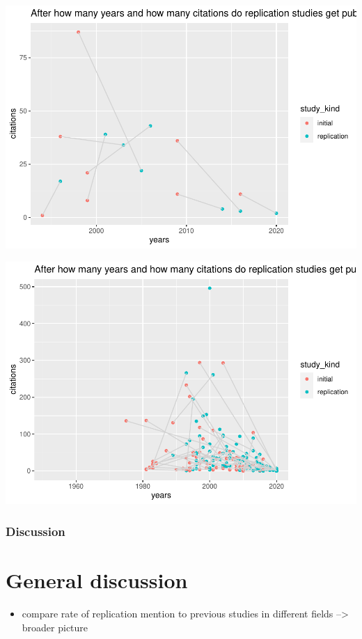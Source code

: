 \documentclass[]{elsarticle} %
\providecommand{\tightlist}{%
  \setlength{\itemsep}{0pt}\setlength{\parskip}{0pt}}
\begin{document}
\includegraphics{ReplicationLing_files/figure-latex/plot cit and years direct-1.pdf}

\includegraphics{ReplicationLing_files/figure-latex/plot cit and years all-1.pdf}

\hypertarget{discussion-1}{%
\subsubsection{Discussion}\label{discussion-1}}

\hypertarget{general-discussion}{%
\section{General discussion}\label{general-discussion}}

\begin{itemize}
\tightlist
\item
  compare rate of replication mention to previous studies in different
  fields --\textgreater{} broader picture
\end{itemize}
\end{document}
